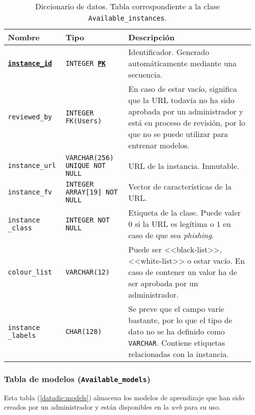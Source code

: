 \begin{table}
	\small
	\begin{centering}
		\begin{tabular}{@{}p{7em} p{6em} p{20em}@{}}
			\toprule
			\textbf{Nombre} & \textbf{Tipo} & \textbf{Descripción}\\
			\midrule
			\texttt{\textbf{\underline{instance\_id}}} & \texttt{INTEGER \textbf{\underline{PK}}} & Identificador. Generado automáticamente mediante una secuencia. \\
			\texttt{reviewed\_by} & \texttt{INTEGER FK(Users)} & En caso de estar vacío, significa que la URL todavía no ha sido aprobada por un administrador y está en proceso de revisión, por lo que no se puede utilizar para entrenar modelos.\\
			\texttt{instance\_url} & \texttt{VARCHAR(256) UNIQUE NOT NULL} &  URL de la instancia. Inmutable.\\
			\texttt{instance\_fv} &  \texttt{INTEGER ARRAY[19] NOT NULL} & Vector de características de la URL.   \\
			\texttt{instance \_class} & \texttt{INTEGER NOT NULL} & Etiqueta de la clase. Puede valer $0$ si la URL es legítima o $1$ en caso de que sea \textit{phishing}. \\
			\texttt{colour\_list} & \texttt{VARCHAR(12)} & Puede ser <<black-list>>, <<white-list>> o estar vacío. En caso de contener un valor ha de ser aprobada por un administrador. \\
			\texttt{instance \_labels} & \texttt{CHAR(128)} &  Se preve que el campo varíe bastante, por lo que el tipo de dato no se ha definido como \texttt{VARCHAR}. Contiene etiquetas relacionadas con la instancia.\\
			\bottomrule
		\end{tabular}
	\end{centering}
	\caption[Diccionario de datos: Available\_instances]{Diccionario de datos. Tabla correspondiente a la clase \texttt{Available\_instances}.}
	\label{datadic:instances}
\end{table}


\subsubsection{Tabla de modelos (\texttt{Available\_models})}

Esta tabla (\ref{datadic:models}) almacena los modelos de aprendizaje que han sido creados por un administrador y están disponibles en la \textit{web} para su uso.

